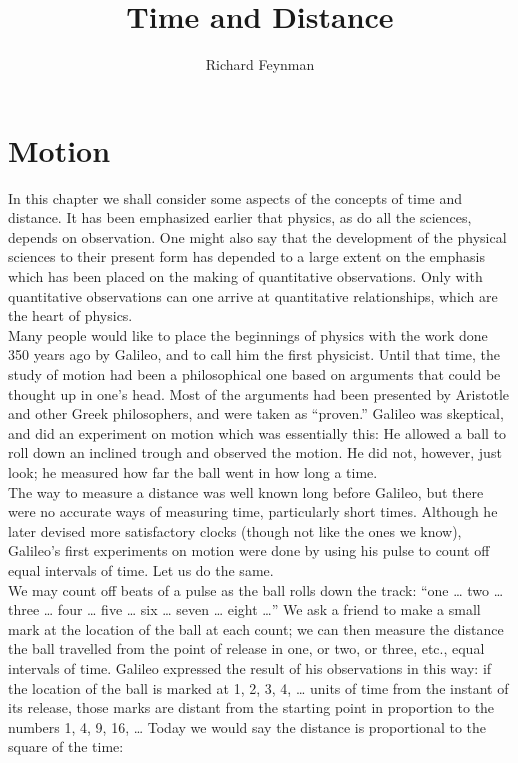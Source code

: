 \documentclass{article}
\title{Time and Distance}
\author{Richard Feynman}
\begin{document}
	\maketitle

	\section{Motion}

	In this chapter we shall consider some aspects of the concepts of time and distance. It has been emphasized earlier that physics, as do all the sciences, depends on observation. One might also say that the development of the physical sciences to their present form has depended to a large extent on the emphasis which has been placed on the making of quantitative observations. Only with quantitative observations can one arrive at quantitative relationships, which are the heart of physics.\\

	Many people would like to place the beginnings of physics with the work done 350 years ago by Galileo, and to call him the first physicist. Until that time, the study of motion had been a philosophical one based on arguments that could be thought up in one’s head. Most of the arguments had been presented by Aristotle and other Greek philosophers, and were taken as “proven.” Galileo was skeptical, and did an experiment on motion which was essentially this: He allowed a ball to roll down an inclined trough and observed the motion. He did not, however, just look; he measured how far the ball went in how long a time.\\

	The way to measure a distance was well known long before Galileo, but there were no accurate ways of measuring time, particularly short times. Although he later devised more satisfactory clocks (though not like the ones we know), Galileo’s first experiments on motion were done by using his pulse to count off equal intervals of time. Let us do the same.\\

	We may count off beats of a pulse as the ball rolls down the track: “one … two … three … four … five … six … seven … eight …” We ask a friend to make a small mark at the location of the ball at each count; we can then measure the distance the ball travelled from the point of release in one, or two, or three, etc., equal intervals of time. Galileo expressed the result of his observations in this way: if the location of the ball is marked at 1, 2, 3, 4, … units of time from the instant of its release, those marks are distant from the starting point in proportion to the numbers 1, 4, 9, 16, … Today we would say the distance is proportional to the square of the time: 
\end{document}
